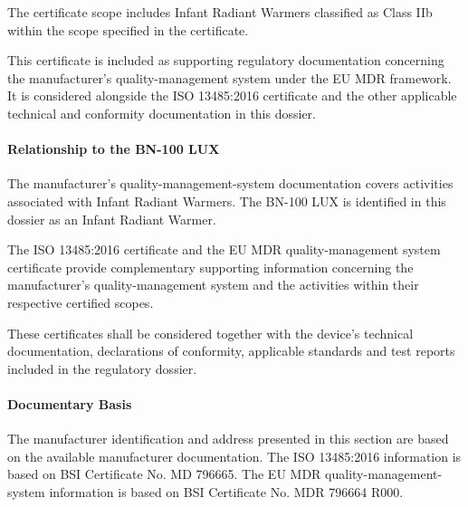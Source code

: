 The certificate scope includes Infant Radiant Warmers classified
as Class IIb within the scope specified in the certificate.

This certificate is included as supporting regulatory
documentation concerning the manufacturer's quality-management
system under the EU MDR framework. It is considered alongside
the ISO 13485:2016 certificate and the other applicable technical
and conformity documentation in this dossier.

\paragraph{Relationship to the BN-100 LUX}

The manufacturer's quality-management-system documentation
covers activities associated with Infant Radiant Warmers.
The BN-100 LUX is identified in this dossier as an Infant
Radiant Warmer.

The ISO 13485:2016 certificate and the EU MDR quality-management
system certificate provide complementary supporting information
concerning the manufacturer's quality-management system and
the activities within their respective certified scopes.

These certificates shall be considered together with the
device's technical documentation, declarations of conformity,
applicable standards and test reports included in the
regulatory dossier.

\paragraph{Documentary Basis}

The manufacturer identification and address presented in this
section are based on the available manufacturer documentation.
The ISO 13485:2016 information is based on BSI Certificate
No. MD 796665. The EU MDR quality-management-system information
is based on BSI Certificate No. MDR 796664 R000.

